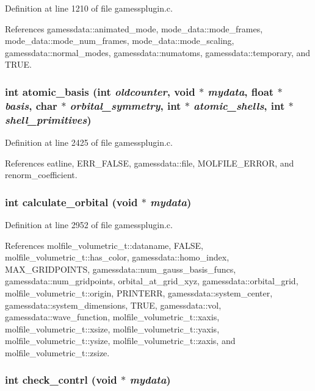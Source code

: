 Definition at line 1210 of file gamessplugin.c.

References gamessdata::animated\_\-mode, mode\_\-data::mode\_\-frames, mode\_\-data::mode\_\-num\_\-frames, mode\_\-data::mode\_\-scaling, gamessdata::normal\_\-modes, gamessdata::numatoms, gamessdata::temporary, and TRUE.
\subsubsection{\setlength{\rightskip}{0pt plus 5cm}int atomic\_\-basis (int {\em oldcounter}, void $\ast$ {\em mydata}, float $\ast$ {\em basis}, char $\ast$ {\em orbital\_\-symmetry}, int $\ast$ {\em atomic\_\-shells}, int $\ast$ {\em shell\_\-primitives})}\label{gamessplugin_8c_a24}




Definition at line 2425 of file gamessplugin.c.

References eatline, ERR\_\-FALSE, gamessdata::file, MOLFILE\_\-ERROR, and renorm\_\-coefficient.
\subsubsection{\setlength{\rightskip}{0pt plus 5cm}int calculate\_\-orbital (void $\ast$ {\em mydata})}\label{gamessplugin_8c_a29}




Definition at line 2952 of file gamessplugin.c.

References molfile\_\-volumetric\_\-t::dataname, FALSE, molfile\_\-volumetric\_\-t::has\_\-color, gamessdata::homo\_\-index, MAX\_\-GRIDPOINTS, gamessdata::num\_\-gauss\_\-basis\_\-funcs, gamessdata::num\_\-gridpoints, orbital\_\-at\_\-grid\_\-xyz, gamessdata::orbital\_\-grid, molfile\_\-volumetric\_\-t::origin, PRINTERR, gamessdata::system\_\-center, gamessdata::system\_\-dimensions, TRUE, gamessdata::vol, gamessdata::wave\_\-function, molfile\_\-volumetric\_\-t::xaxis, molfile\_\-volumetric\_\-t::xsize, molfile\_\-volumetric\_\-t::yaxis, molfile\_\-volumetric\_\-t::ysize, molfile\_\-volumetric\_\-t::zaxis, and molfile\_\-volumetric\_\-t::zsize.
\subsubsection{\setlength{\rightskip}{0pt plus 5cm}int check\_\-contrl (void $\ast$ {\em mydata})\hspace{0.3cm}{\tt  [static]}}\label{gamessplugin_8c_a36}




